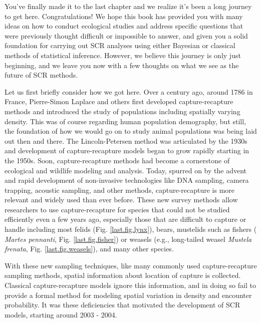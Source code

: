 You've finally made it to the last chapter and we realize it's been a
long journey to get here. Congratulations!
We hope this book has provided you with many ideas on how to conduct
ecological studies and address specific questions that were previously
thought difficult or impossible to answer, and given you a solid
foundation for carrying out SCR analyses
using either Bayesian or classical methods of statistical inference.
However, we believe this journey is only just beginning, and we leave
you now with a few thoughts on what we see as the future of SCR
methods.

Let us first briefly consider how we got here. Over a century ago,
around 1786 in France, Pierre-Simon Laplace and others first developed
capture-recapture methods and introduced the study of populations
including spatially varying density. This was of course regarding
human population demography, but still, the foundation of how we would
go on to study animal populations was being laid out then and there.
The Lincoln-Petersen method was articulated by the 1930s and
development of capture-recapture models began to grow rapidly starting
in the 1950s.  Soon, capture-recapture methods had become a
cornerstone of ecological and wildlife modeling and analysis. Today,
spurred on by the advent and rapid development of non-invasive
technologies like DNA sampling, camera trapping, acoustic sampling,
and other methods, capture-recapture is more relevant and widely used
than ever before. These new
survey methods allow researchers to use capture-recapture for species
that could not be studied efficiently even a few years ago, especially
those that are difficult to capture or handle including most felids
(Fig. \ref{last.fig.lynx}), bears, mustelids such as fishers ({\it
  Martes pennanti}, Fig. \ref{last.fig.fisher}) or weasels (e.g.,
long-tailed weasel {\it Mustela frenata},
Fig. \ref{last.fig.weasels}), and many other species.

With these new sampling techniques, like many commonly used
capture-recapture sampling methods, spatial information about location
of capture is collected.  Classical capture-recapture models ignore
this information, and in doing so fail to provide a formal method for
modeling spatial variation in density and encounter
probability. %
It was these deficiencies that motivated %
the development of SCR models, starting around
2003 - 2004.


